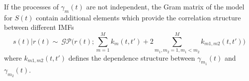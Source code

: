 If the processes of $\gamma_m(t)$ are not independent, the Gram matrix of the model for $S(t)$ contain additional elements which provide the correlation structure between different IMFs
\begin{equation}
s(t) |r(t)\sim ~   \mathcal{GP} \bigg(r(t); \sum_{m=1}^M k_m(t,t') + 2\sum_{m_1,m_2=1, m_1<m_2}^M k_{m1,m2}(t,t')\bigg)
\end{equation}
where $k_{m1,m2}(t,t')$ defines the dependence structure between $\gamma_{m_1}(t)$ and $\gamma_{m_2}(t)$.
